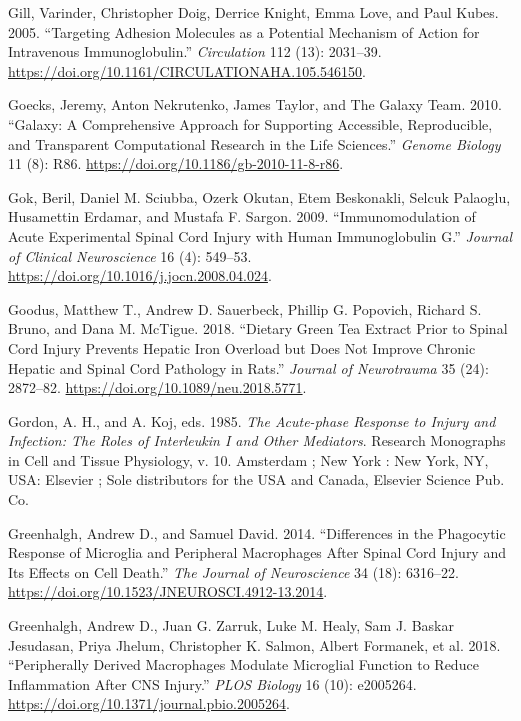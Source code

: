 \documentclass[9pt,lineno]{elife}
\newlength{\cslhangindent}
\newlength{\cslentryspacingunit} %
\newenvironment{CSLReferences}[2] %
 {%
  \setlength{\parindent}{0pt}
  \ifodd #1
  \let\oldpar\par
  \def\par{\hangindent=\cslhangindent\oldpar}
  \fi
  \setlength{\parskip}{#2\cslentryspacingunit}
 }%
 {}
\begin{document}
\begin{landscape}
\begin{landscape}
\begin{landscape}
\begin{landscape}
\begin{CSLReferences}{1}{0}
\leavevmode{}%
Gill, Varinder, Christopher Doig, Derrice Knight, Emma Love, and Paul Kubes. 2005. {``Targeting {Adhesion Molecules} as a {Potential Mechanism} of {Action} for {Intravenous Immunoglobulin}.''} \emph{Circulation} 112 (13): 2031--39. \url{https://doi.org/10.1161/CIRCULATIONAHA.105.546150}.

\leavevmode{}%
Goecks, Jeremy, Anton Nekrutenko, James Taylor, and The Galaxy Team. 2010. {``Galaxy: A Comprehensive Approach for Supporting Accessible, Reproducible, and Transparent Computational Research in the Life Sciences.''} \emph{Genome Biology} 11 (8): R86. \url{https://doi.org/10.1186/gb-2010-11-8-r86}.

\leavevmode{}%
Gok, Beril, Daniel M. Sciubba, Ozerk Okutan, Etem Beskonakli, Selcuk Palaoglu, Husamettin Erdamar, and Mustafa F. Sargon. 2009. {``Immunomodulation of Acute Experimental Spinal Cord Injury with Human Immunoglobulin {G}.''} \emph{Journal of Clinical Neuroscience} 16 (4): 549--53. \url{https://doi.org/10.1016/j.jocn.2008.04.024}.

\leavevmode{}%
Goodus, Matthew T., Andrew D. Sauerbeck, Phillip G. Popovich, Richard S. Bruno, and Dana M. McTigue. 2018. {``Dietary Green Tea Extract Prior to Spinal Cord Injury Prevents Hepatic Iron Overload but Does Not Improve Chronic Hepatic and Spinal Cord Pathology in Rats.''} \emph{Journal of Neurotrauma} 35 (24): 2872--82. \url{https://doi.org/10.1089/neu.2018.5771}.

\leavevmode{}%
Gordon, A. H., and A. Koj, eds. 1985. \emph{The {Acute-phase} Response to Injury and Infection: The Roles of Interleukin {I} and Other Mediators}. Research Monographs in Cell and Tissue Physiology, v. 10. {Amsterdam ; New York : New York, NY, USA}: {Elsevier ; Sole distributors for the USA and Canada, Elsevier Science Pub. Co}.

\leavevmode{}%
Greenhalgh, Andrew D., and Samuel David. 2014. {``Differences in the {Phagocytic Response} of {Microglia} and {Peripheral Macrophages} After {Spinal Cord Injury} and {Its Effects} on {Cell Death}.''} \emph{The Journal of Neuroscience} 34 (18): 6316--22. \url{https://doi.org/10.1523/JNEUROSCI.4912-13.2014}.

\leavevmode{}%
Greenhalgh, Andrew D., Juan G. Zarruk, Luke M. Healy, Sam J. Baskar Jesudasan, Priya Jhelum, Christopher K. Salmon, Albert Formanek, et al. 2018. {``Peripherally Derived Macrophages Modulate Microglial Function to Reduce Inflammation After {CNS} Injury.''} \emph{PLOS Biology} 16 (10): e2005264. \url{https://doi.org/10.1371/journal.pbio.2005264}.


\end{CSLReferences}
\end{landscape}
\end{landscape}
\end{landscape}
\end{landscape}
\end{document}
